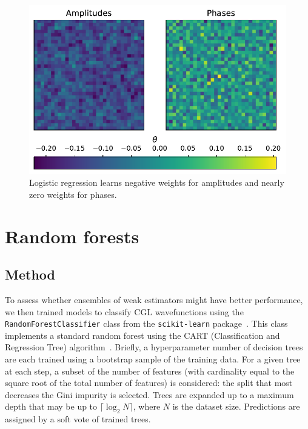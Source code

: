\documentclass[nofootinbib,pre,superscriptaddress,twocolumn,longbibliography,floatfix]{revtex4-2}
\begin{document}
\begin{figure}[h]
    \centering
    \includegraphics[width=1.0\linewidth]{../figures/lr_importances.pdf}
    \caption{Logistic regression learns negative weights for amplitudes and nearly zero weights for phases.}
    \label{fig:lr_importances}
\end{figure}

\section{Random forests}
\subsection{Method}
To assess whether ensembles of weak estimators might have better performance,
we then trained models to classify CGL wavefunctions using the \texttt{RandomForestClassifier}
class from the \texttt{scikit-learn} package~\cite{scikit-learn}.
This class implements a standard random forest using the CART (Classification and Regression Tree) algorithm~\cite{breiman1996bagging, breiman1984classification}.
Briefly, a hyperparameter number of decision trees are each trained using a bootstrap sample of the training data.
For a given tree at each step, a subset of the number of features (with cardinality equal to the square root of the total number of features)
is considered: the split that most decreases the Gini impurity is selected.
Trees are expanded up to a maximum depth that may be up to $\lceil\log_2 N\rceil$, where $N$ is the dataset size.
Predictions are assigned by a soft vote of trained trees.
\end{document}
